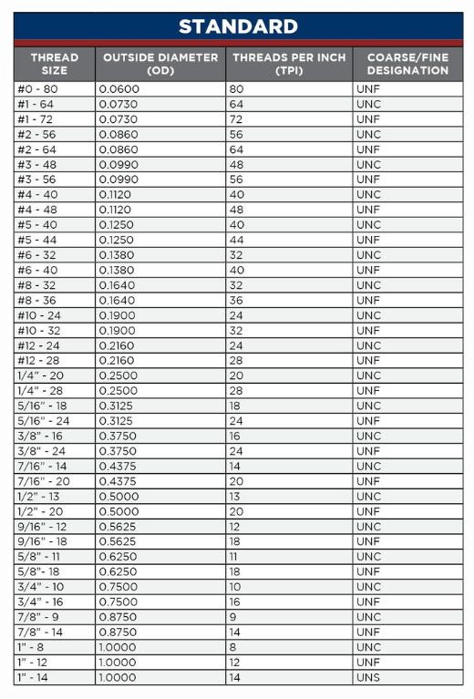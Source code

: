 \documentclass[english,]{article}
\begin{document}
\includegraphics{Introduction to Nut and Bolt Sizes_files/6307bab88eccb893095369.jpg}
\newpage
\end{document}
